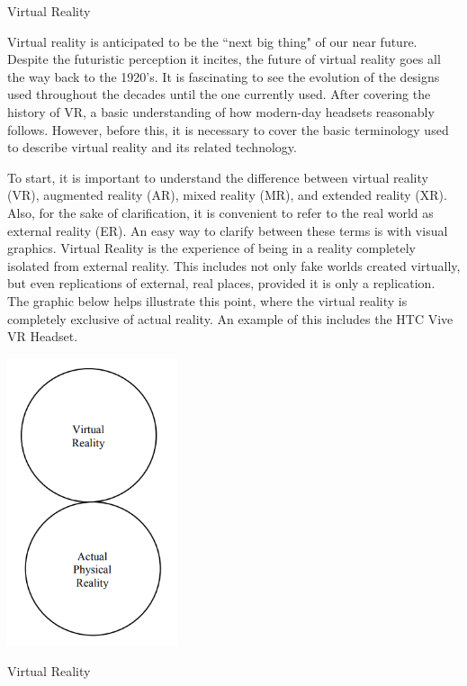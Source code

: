 \documentclass[12pt]{article}
\begin{document}
\begin{center}
\Huge Virtual Reality
\end{center}

Virtual reality is anticipated to be the ``next big thing" of our near future. \cite{baruahVirtualRealityVRTK42020} Despite the futuristic perception it incites, the future of virtual reality goes all the way back to the 1920's. \cite{grasnickBasicsVirtualReality2021a} It is fascinating to see the evolution of the designs used throughout the decades until the one currently used. After covering the history of VR, a basic understanding of how modern-day headsets reasonably follows. However, before this, it is necessary to cover the basic terminology used to describe virtual reality and its related technology.

To start, it is important to understand the difference between virtual reality (VR), augmented reality (AR), mixed reality (MR), and extended reality (XR). Also, for the sake of clarification, it is convenient to refer to the real world as external reality (ER). An easy way to clarify between these terms is with visual graphics. Virtual Reality is the experience of being in a reality completely isolated from external reality. This includes not only fake worlds created virtually, but even replications of external, real places, provided it is only a replication. The graphic below helps illustrate this point, where the virtual reality is completely exclusive of actual reality. An example of this includes the HTC Vive VR Headset.

\begin{center}
\centering
\includegraphics[width = 5cm]{Image A.png}

Virtual Reality
\cite{vermaAdvancesAugmentedReality2022a}
\end{center}
\end{document}
